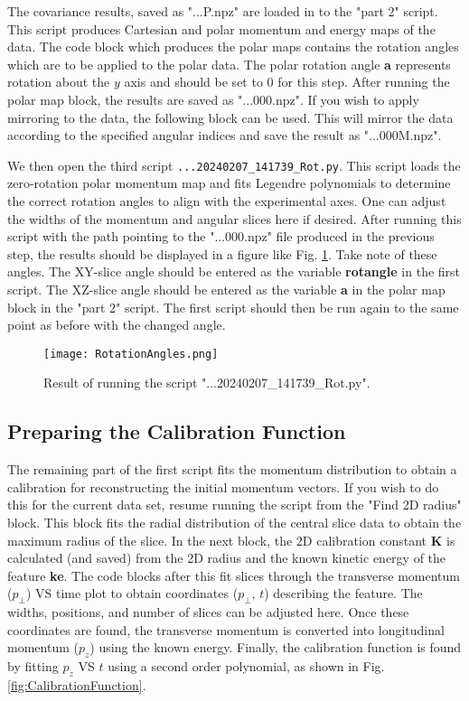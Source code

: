 \documentclass[12pt]{article}
\begin{document}
The covariance results, saved as "...P.npz" are loaded in to the "part 2" script.
This script produces Cartesian and polar momentum and energy maps of the data.
The code block which produces the polar maps contains the rotation angles which are to be applied to the polar data.
The polar rotation angle \textbf{a} represents rotation about the $y$ axis and should be set to 0 for this step.
After running the polar map block, the results are saved as "...000.npz".
If you wish to apply mirroring to the data, the following block can be used.
This will mirror the data according to the specified angular indices and save the result as "...000M.npz".

We then open the third script \texttt{...20240207\_141739\_Rot.py}.
This script loads the zero-rotation polar momentum map and fits Legendre polynomials to determine the correct rotation angles to align with the experimental axes.
One can adjust the widths of the momentum and angular slices here if desired.
After running this script with the path pointing to the "...000.npz" file produced in the previous step, the results should be displayed in a figure like Fig. \ref{fig:RotationAngles}.
Take note of these angles.
The XY-slice angle should be entered as the variable \textbf{rotangle} in the first script.
The XZ-slice angle should be entered as the variable \textbf{a} in the polar map block in the "part 2" script.
The first script should then be run again to the same point as before with the changed angle.

\begin{figure}
\centering
\texttt{[image: RotationAngles.png]}
\caption{
Result of running the script "...20240207\_141739\_Rot.py".
}\label{fig:RotationAngles}
\end{figure}

\subsection{Preparing the Calibration Function}

The remaining part of the first script fits the momentum distribution to obtain a calibration for reconstructing the initial momentum vectors.
If you wish to do this for the current data set, resume running the script from the "Find 2D radius" block.
This block fits the radial distribution of the central slice data to obtain the maximum radius of the slice.
In the next block, the 2D calibration constant \textbf{K} is calculated (and saved) from the 2D radius and the known kinetic energy of the feature \textbf{ke}. 
The code blocks after this fit slices through the transverse momentum ($p_\perp$) VS time plot to obtain coordinates ($p_\perp$, $t$) describing the feature.
The widths, positions, and number of slices can be adjusted here.
Once these coordinates are found, the transverse momentum is converted into longitudinal momentum ($p_z$) using the known energy.
Finally, the calibration function is found by fitting $p_z$ VS $t$ using a second order polynomial, as shown in Fig. \ref{fig:CalibrationFunction}.
\end{document}
